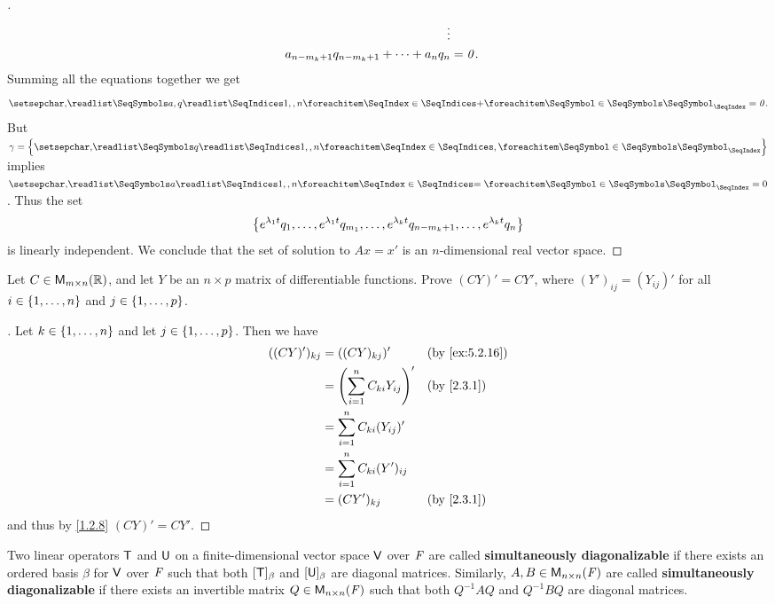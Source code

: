 \begin{proof}[]
\begin{align*}
		\vdots                                                      \\
		a_{n - m_k + 1} q_{n - m_k + 1} + \cdots + a_n q_n & = \mathit{0}.
	\end{align*}
	Summing all the equations together we get
	\[
		\seq[+]{a,q}{1,,n} = \zv.
	\]
	But \(\gamma = \set{\seq{q}{1,,n}}\) implies \(\seq[=]{a}{1,,n} = 0\).
	Thus the set
	\[
		\left\lbrace e^{\lambda_1 t} q_1, \dots, e^{\lambda_1 t} q_{m_1}, \dots, e^{\lambda_k t} q_{n - m_k + 1}, \dots, e^{\lambda_k t} q_n\right\rbrace
	\]
	is linearly independent.
	We conclude that the set of solution to \(Ax = x'\) is an \(n\)-dimensional real vector space.
\end{proof}

\begin{ex}\label{ex:5.2.16}
	Let \(C \in \ms[m][n][\R]\), and let \(Y\) be an \(n \times p\) matrix of differentiable functions.
	Prove \((CY)' = C Y'\), where \((Y')_{i j} = (Y_{i j})'\) for all \(i \in \left\lbrace1, \dots, n\right\rbrace\) and \(j \in \left\lbrace1, \dots, p\right\rbrace\).
\end{ex}

\begin{proof}[]
	Let \(k \in \left\lbrace1, \dots, n\right\rbrace\) and let \(j \in \left\lbrace1, \dots, p\right\rbrace\).
	Then we have
	\begin{align*}
		((CY)')_{k j} & = ((CY)_{k j})'                        &  & \by{ex:5.2.16} \\
		              & = \pa{\sum_{i = 1}^n C_{k i} Y_{i j}}' &  & \by{2.3.1}     \\
		              & = \sum_{i = 1}^n C_{k i} (Y_{i j})'                        \\
		              & = \sum_{i = 1}^n C_{k i} (Y')_{i j}                        \\
		              & = (C Y')_{k j}                         &  & \by{2.3.1}
	\end{align*}
	and thus by \cref{1.2.8} \((CY)' = C Y'\).
\end{proof}

\begin{defn}\label{5.2.8}
	Two linear operators \(\mathsf{T}\) and \(\mathsf{U}\) on a finite-dimensional vector space \(\mathsf{V}\) over \(\mathit{F}\) are called \textbf{simultaneously diagonalizable} if there exists an ordered basis \(\beta\) for \(\mathsf{V}\) over \(\mathit{F}\) such that both \([\mathsf{T}]_{\beta}\) and \([\mathsf{U}]_{\beta}\) are diagonal matrices.
	Similarly, \(A, B \in \ms[n][n][\F]\) are called \textbf{simultaneously diagonalizable} if there exists an invertible matrix \(Q \in \ms[n][n][\F]\) such that both \(Q^{-1} A Q\) and \(Q^{-1} B Q\) are diagonal matrices.
\end{defn}

